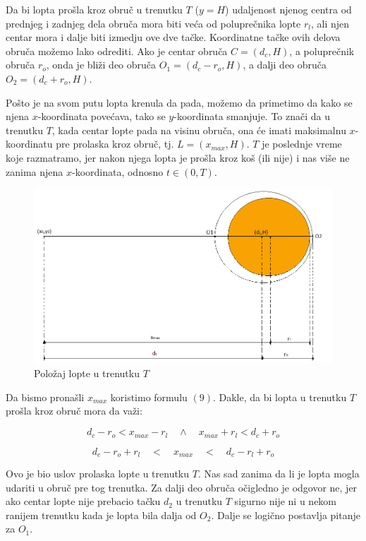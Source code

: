 \documentclass[a4paper, 12pt]{article}
\begin{document}
Da bi lopta prošla kroz obruč u trenutku $T$ ($y = H$) udaljenost njenog centra od prednjeg i zadnjeg dela obruča mora biti veća od poluprečnika lopte $r_l$, ali njen centar mora i dalje biti izmedju ove dve tačke. Koordinatne tačke ovih delova obruča možemo lako odrediti. Ako je centar obruča $C = (d_c,H)$, a poluprečnik obruča $r_o$, onda je bliži deo obruča $O_1 = (d_c - r_o, H)$, a dalji deo obruča $O_2 = (d_c + r_o, H)$.

Pošto je na svom putu lopta krenula da pada, možemo da primetimo da kako se njena $x$-koordinata povećava, tako se $y$-koordinata smanjuje. To znači da u trenutku $T$, kada centar lopte pada na visinu obruča, ona će imati maksimalnu $x$-koordinatu pre prolaska kroz obruč, tj. $L = (x_{max},H)$. $T$ je poslednje vreme koje razmatramo, jer nakon njega lopta je prošla kroz koš (ili nije) i nas više ne zanima njena $x$-koordinata, odnosno $t \in (0,T)$.

\begin{figure}[h]
\hspace*{1.6cm}
\includegraphics[scale=0.3]{pic3}
\caption{Položaj lopte u trenutku $T$}
\end{figure}

 Da bismo pronašli $x_{max}$ koristimo formulu $(9)$. Dakle, da bi lopta u trenutku $T$ prošla kroz obruč mora da važi:

\[ d_c - r_o < x_{max} - r_l \quad \land \quad x_{max} + r_l < d_c + r_o \]

\begin{equation}
d_c - r_o + r_l \quad < \quad x_{max} \quad < \quad d_c - r_l + r_o
\end{equation}


Ovo je bio uslov prolaska lopte u trenutku $T$. Nas sad zanima da li je lopta mogla udariti u obruč pre tog trenutka. Za dalji deo obruča očigledno je odgovor ne, jer ako centar lopte nije prebacio tačku $d_2$ u trenutku $T$ sigurno nije ni u nekom ranijem trenutku kada je lopta bila dalja od $O_2$. Dalje se logično postavlja pitanje za $O_1$.
\end{document}
